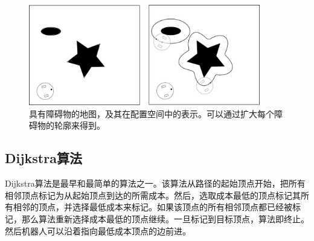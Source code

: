 \begin{figure}[!htb]
\centering
\includegraphics[width=0.9\textwidth]{figs/configurationspace}
\caption{具有障碍物的地图，及其在配置空间中的表示。可以通过扩大每个障碍物的轮廓来得到。 \label{fig:cspace}}
\end{figure}


\subsection{Dijkstra算法}

Dijkstra算法是最早和最简单的算法之一\cite{dijkstra1959note}。该算法从路径的起始顶点开始，把所有相邻顶点标记为从起始顶点到达的所需成本。然后，选取成本最低的顶点标记其所有相邻的顶点，并选择最低成本来标记。如果该顶点的所有相邻顶点都已经被标记，那么算法重新选择成本最低的顶点继续。一旦标记到目标顶点，算法即终止。然后机器人可以沿着指向最低成本顶点的边前进。

